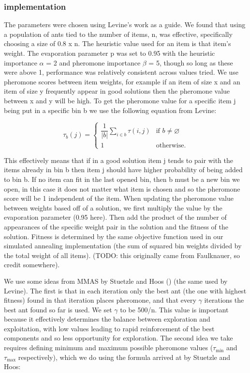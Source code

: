 \documentclass[12pt]{article}
\begin{document}
\subsubsection{implementation}
The parameters were chosen using Levine’s work \cite{levine} as a guide. We found that using a population of ants tied to the number of items, n, was effective, specifically choosing a size of 0.8 x n. The heuristic value used for an item is that item’s weight. The evaporation parameter p was set to 0.95 with the heuristic importance $\alpha$ = 2 and pheromone importance $\beta$ = 5, though so long as these were above 1, performance was relatively consistent across values tried. We use pheromone scores between item weights, for example if an item of size x and an item of size y frequently appear in good solutions then the pheromone value between x and y will be high. To get the pheromone value for a specific item j being put in a specific bin b we use the following equation from Levine: 

\[
\tau_b(j) =
\begin{cases}
\dfrac{1}{|b|}\sum_{i \in b} \tau(i,j) & \text{if } b \neq \varnothing\\[10pt]
1 & \text{otherwise}.
\end{cases}
\]

This effectively means that if in a good solution item j tends to pair with the items already in bin b then item j should have higher probability of being added to bin b. If no item can fit in the last opened bin, then b must be a new bin we open, in this case it does not matter what item is chosen and so the pheromone score will be 1 independent of the item. When updating the pheromone value between weights based off of a solution, we first multiply the value by the evaporation parameter (0.95 here). Then add the product of the number of appearances of the specific weight pair in the solution and the fitness of the solution. Fitness is determined by the same objective function used in our simulated annealing implementation (the sum of squared bin weights divided by the total weight of all items). (TODO: this originally came from Faulknauer, so credit somewhere). 

We use some ideas from MMAS by Stuetzle and Hoos (\cite{stuetzle}) (the same used by Levine). The first is that in each iteration only the best ant (the one with highest fitness) found in that iteration places pheromone, and that every $\gamma$ iterations the best ant found so far is used. We set $\gamma$ to be 500/n. This value is important because it effectively determines the balance between exploration and exploitation, with low values leading to rapid reinforcement of the best components and so less opportunity for exploration. The second idea we take requires defining minimum and maximum possible pheromone values ($\tau_{\min}$ and $\tau_{\max}$ respectively), which we do using the formula arrived at by Stuetzle and Hoos: 
\end{document}
